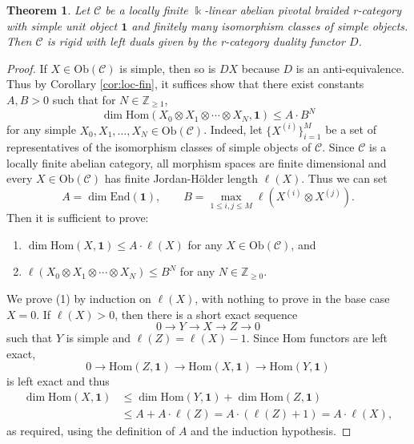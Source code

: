 \documentclass[11pt, reqno]{amsart}
\newtheorem{thm}{Theorem}[section]
\theoremstyle{definition}\newtheorem{defi}[thm]{Definition}
\theoremstyle{definition}\newtheorem{rem}[thm]{Remark}
\theoremstyle{definition}\newtheorem{exam}[thm]{Example}
\theoremstyle{definition}\newtheorem{assum}[thm]{Assumption}
\newcommand{\cC}{\mathcal{C}}
\newcommand{\ZZ}{\mathbb{Z}}
\newcommand{\vac}{\mathbf{1}}
\begin{document}
\begin{thm}\label{thm:fin-abelian-rigid}
Let $\cC$ be a locally finite $\Bbbk$-linear abelian pivotal braided r-category with simple unit object $\vac$ and finitely many isomorphism classes of simple objects. Then $\cC$ is rigid with left duals given by the r-category duality functor $D$.
\end{thm}
\begin{proof}
If $X\in\mathrm{Ob}(\cC)$ is simple, then so is $DX$ because $D$ is an anti-equivalence. Thus by Corollary \ref{cor:loc-fin}, it suffices show that there exist constants $A,B>0$ such that for $N\in\ZZ_{\geq 1}$,
\begin{equation*}
\dim\mathrm{Hom}(X_0\otimes X_1\otimes\cdots\otimes X_N,\vac)\leq A\cdot B^N
\end{equation*}
for any simple $X_0,X_1,\ldots,X_N\in\mathrm{Ob}(\cC)$. Indeed, let $\lbrace X^{(i)}\rbrace_{i=1}^M$ be a set of representatives of the isomorphism classes of simple objects of $\cC$.
Since $\cC$ is a locally finite abelian category, all morphism spaces are finite dimensional and every $X\in\mathrm{Ob}(\mathcal{C})$ has finite Jordan-H\"{o}lder length $\ell(X)$. Thus we can set
\begin{equation*}
A =\dim\mathrm{End}(\vac),\qquad B=\max_{1\leq i,j\leq M} \ell(X^{(i)}\otimes X^{(j)}).
\end{equation*}
 Then it is sufficient to prove:
\begin{enumerate}

\item $\dim\mathrm{Hom}(X,\vac)\leq A\cdot\ell(X)$ for any $X\in\mathrm{Ob}(\cC)$, and

\item $\ell(X_0\otimes X_1\otimes\cdots\otimes X_N)\leq B^N$ for any $N\in\ZZ_{\geq 0}$.

\end{enumerate}

We prove (1) by induction on $\ell(X)$, with nothing to prove in the base case $X=0$. If $\ell(X)>0$, then there is a short exact sequence
\begin{equation*}
0\longrightarrow Y\longrightarrow X\longrightarrow Z\longrightarrow 0
\end{equation*}
such that $Y$ is simple and $\ell(Z)=\ell(X)-1$. Since Hom functors are left exact, 
\begin{equation*}
0\longrightarrow\mathrm{Hom}(Z,\vac)\longrightarrow\mathrm{Hom}(X,\vac)\longrightarrow\mathrm{Hom}(Y,\vac)
\end{equation*}
is left exact and thus
\begin{align*}
\dim\mathrm{Hom}(X,\vac) & \leq\dim\mathrm{Hom}(Y,\vac)+\dim\mathrm{Hom}(Z,\vac)\\
&\leq A+A\cdot\ell(Z) =A\cdot(\ell(Z)+1)=A\cdot\ell(X),
\end{align*}
as required, using the definition of $A$ and the induction hypothesis.


\end{proof}
\end{document}
